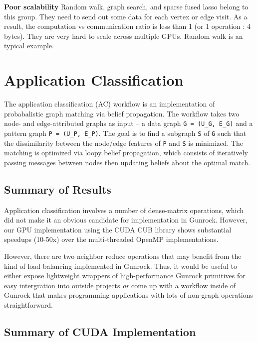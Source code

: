 \documentclass[10pt,oneside]{memoir}
\begin{document}
\textbf{Poor scalability} Random walk, graph search, and sparse fused
lasso belong to this group. They need to send out some data for each
vertex or edge visit. As a result, the computation vs communication
ratio is less than 1 (or 1 operation : 4 bytes). They are very hard to
scale across multiple GPUs. Random walk is an typical example.

\hypertarget{application-classification-1}{%
\chapter{Application
Classification}\label{application-classification-1}}

The application classification (AC) workflow is an implementation of
probabalistic graph matching via belief propagation. The workflow takes
two node- and edge-attributed graphs as input -- a data graph
\texttt{G\ =\ (U\_G,\ E\_G)} and a pattern graph
\texttt{P\ =\ (U\_P,\ E\_P)}. The goal is to find a subgraph \texttt{S}
of \texttt{G} such that the dissimilarity between the node/edge features
of \texttt{P} and \texttt{S} is minimized. The matching is optimized via
loopy belief propagation, which consists of iteratively passing messages
between nodes then updating beliefs about the optimal match.

\hypertarget{summary-of-results}{%
\section{Summary of Results}\label{summary-of-results}}

Application classification involves a number of dense-matrix operations,
which did not make it an obvious candidate for implementation in
Gunrock. However, our GPU implementation using the CUDA CUB library
shows substantial speedups (10-50x) over the multi-threaded OpenMP
implementations.

However, there are two neighbor reduce operations that may benefit from
the kind of load balancing implemented in Gunrock. Thus, it would be
useful to either expose lightweight wrappers of high-performance Gunrock
primitives for easy intergration into outside projects \emph{or} come up
with a workflow inside of Gunrock that makes programming applications
with lots of non-graph operations straightforward.

\hypertarget{summary-of-cuda-implementation}{%
\section{Summary of CUDA
Implementation}\label{summary-of-cuda-implementation}}
\end{document}
